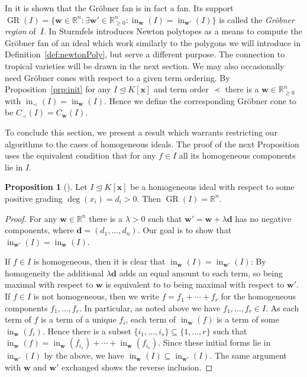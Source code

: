 \documentclass[
  paper=a4,
  titlepage,
  bibliography=totoc,
  pagesize=pdftex
]{scrartcl}
\numberwithin{figure}{section}
\numberwithin{equation}{section}
\numberwithin{table}{section}
\newcommand*\setR{\mathds{R}}
\let\vec\mathbf
\let\idealof\trianglelefteq
\DeclareMathOperator{\initial}{in}
\DeclareMathOperator{\GR}{GR}
\theoremstyle{definition}
\newtheorem{proposition}[definition]{Proposition}
\numberwithin{definition}{section}
\begin{document}
In \cite[Theorem~2.19]{compGrobFan} it is shown that the Gröbner fan is in fact a fan. Its
support $\GR(I) = \{ \vec w \in \setR^n : \exists \vec w' \in \setR^n_{\geq0} :
\initial_{\vec w}(I) = \initial_{\vec w'}(I)\}$ is called the \emph{Gröbner region}
of~$I$. In \cite{SturmGBCP} Sturmfels introduces Newton polytopes as a means to compute
the Gröbner fan of an ideal which work similarly to the polygons we will introduce in
Definition~\ref{def:newtonPoly}, but serve a different purpose. The connection to tropical
varieties will be drawn in the next section. We may also occasionally need Gröbner cones
with respect to a given term ordering. By Proposition~\ref{prp:init} for any $I \idealof
K[\vec x]$ and term order $\prec$ there is a $\vec w \in \setR^n_{\geq0}$ with
$\initial_\prec(I) = \initial_{\vec w}(I)$. Hence we define the corresponding Gröbner cone
to be $C_\prec(I) = C_{\vec w}(I)$.

To conclude this section, we present a result which warrants restricting our algorithms to
the cases of homogeneous ideals. The proof of the next Proposition uses the equivalent
condition that for any $f \in I$ all its homogeneous components lie in $I$.

\begin{proposition}[{\cite[Proposition~1.12]{SturmGBCP}}]
  \label{prp:grRegion}
  Let $I \idealof K[\vec x]$ be a homogeneous ideal with respect to some positive grading
  $\deg(x_i) = d_i > 0$. Then $\GR(I) = \setR^n$.
  \begin{proof}
    For any $\vec w \in \setR^n$ there is a $\lambda > 0$ such that $\vec w' = \vec w +
    \lambda \vec d$ has no negative components, where $\vec d = (d_1, \dots, d_n)$. Our
    goal is to show that $\initial_{\vec w'}(I) = \initial_{\vec w}(I)$.

    If $f \in I$ is homogeneous, then it is clear that $\initial_{\vec w}(I) =
    \initial_{\vec w'}(I)$: By homogeneity the additional $\lambda \vec d$ adds an equal
    amount to each term, so being maximal with respect to $\vec w$ is equivalent to to
    being maximal with respect to $\vec w'$. If $f \in I$ is not homogeneous, then we
    write $f = f_1 + \cdots + f_r$ for the homogeneous components $f_1,\dots,f_r$. In
    particular, as noted above we have $f_1, \dots, f_r \in I$. As each term of $f$ is a
    term of a unique $f_i$, each term of $\initial_{\vec w}(f)$ is a term of some
    $\initial_{\vec w}(f_i)$. Hence there is a subset $\{i_1, \dots, i_s\} \subseteq \{1,
    \dots, r\}$ such that $\initial_{\vec w}(f) = \initial_{\vec w}(f_{i_1}) + \cdots +
    \initial_{\vec w}(f_{i_s})$. Since these initial forms lie in $\initial_{\vec w'}(I)$
    by the above, we have $\initial_{\vec w}(I) \subseteq \initial_{\vec w'}(I)$. The same
    argument with $\vec w$ and $\vec w'$ exchanged shows the reverse inclusion.
  \end{proof}
\end{proposition}
\end{document}
